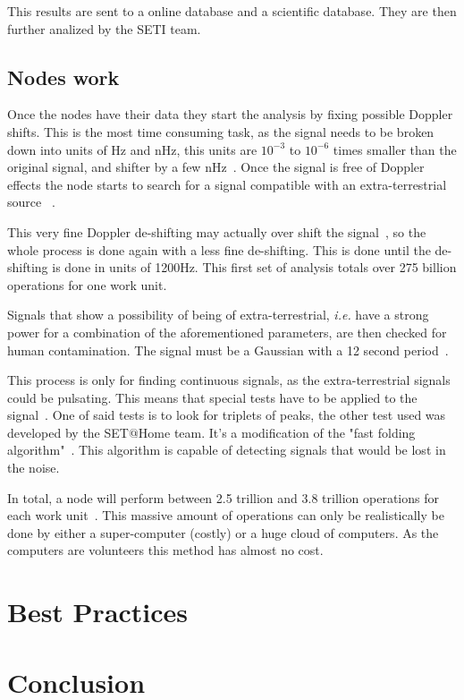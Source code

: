 This results are sent to a online database and a scientific database. They are 
then further analized by the SETI team.
\subsection{Nodes work}
\label{hid-sp18-601-subsection-nodes-work}
Once the nodes have their data they start the analysis by fixing possible 
Doppler shifts. This is the most time consuming task, as the signal needs to be 
broken down into units of Hz and nHz, this units are $10^{-3}$ to $10^{-6}$ 
times smaller than the original signal, and shifter by a few 
nHz~\cite{hid-sp18-601-www-sathome-howworks}. Once the signal is free of Doppler
 effects the node starts to search for a signal compatible with an 
extra-terrestrial source
~\cite{hid-sp18-601-www-sathome-howworks,hid-sp18-601-paper-cocconi1959searching}.

This very fine Doppler de-shifting may actually over shift the 
signal~\cite{hid-sp18-601-www-sathome-howworks}, so the whole
process is done again with a less fine de-shifting. This is done until the 
de-shifting
is done in units of 1200Hz. This first set of analysis totals over 275 billion 
operations for one work unit.

Signals that show a possibility of being of extra-terrestrial, \textit{i.e.} 
have a strong power for a combination of the aforementioned parameters, are then 
 checked for human contamination. The signal must be 
a Gaussian with a 12 second period~\cite{hid-sp18-601-paper-anderson2002seti}.

This process is only for finding continuous signals, as the extra-terrestrial 
signals could be pulsating. This means that special tests have to be applied 
to the signal~\cite{hid-sp18-601-www-sathome-howworks}. One of said tests is 
to look for triplets of peaks, the other test
used was developed by the SET$@$Home team. It's a modification of the 
"fast folding algorithm"~\cite{hid-sp18-601-paper-korpela2001seti}.
This algorithm is capable of detecting signals that would be lost in the noise.

In total, a node will perform between 2.5 trillion and 3.8 trillion operations 
for each work unit~\cite{hid-sp18-601-www-sathome-howworks}. 
This massive amount of operations can only be realistically 
be done by either a super-computer (costly) or a huge cloud of computers. As the
 computers are volunteers this method has almost no cost.
\section{Best Practices}


\section{Conclusion}

\begin{acks}

\end{acks}


 


